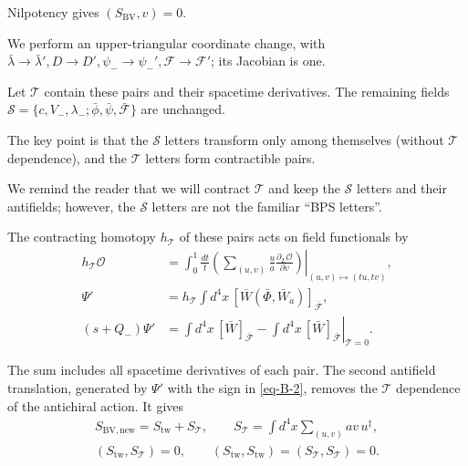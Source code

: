 \documentclass[11pt]{article}
\numberwithin{equation}{section}
\numberwithin{figure}{section}
\numberwithin{table}{section}
\begin{document}
Nilpotency gives $(S_{\mathrm{BV}},v)=0$.

We perform an upper-triangular coordinate change, with $\bar\lambda\to \bar\lambda', D \to D', \psi_- \to\psi_-', \mathcal F \to\mathcal F'$; its Jacobian is one.

Let $\mathcal T$ contain these pairs and their spacetime derivatives. The remaining fields $\mathcal S=\{c,V_-,\lambda_-;\bar\phi,\bar\psi,\bar{\mathcal F}\}$ are unchanged.

The key point is that the $\mathcal S$ letters transform only among themselves (without $\mathcal T$ dependence), and the $\mathcal T$ letters form contractible pairs.

\begin{proofbox}
We remind the reader that we will contract $\mathcal T$ and keep the $\mathcal S$ letters and their antifields; however, the $\mathcal S$ letters are not the familiar ``BPS letters''.
\end{proofbox}

The contracting homotopy $h_{\mathcal T}$ of these pairs acts on field functionals by
\begin{equation}\label{eq-B-4}
\begin{aligned}
h_{\mathcal T}\mathcal O
&=\int_0^1\frac{dt}{t}
\left.\left(\sum_{(u,v)}\frac ua\frac{\partial_L\mathcal O}{\partial v}\right)
\right|_{(u,v)\mapsto(tu,tv)},\\
\Psi'&=h_{\mathcal T}\int d^4x\,[\bar W(\bar\Phi,\bar W_{\dot a})]_{\bar{\mathcal F}},\\
(s+Q_-)\Psi'
&=\int d^4x\,[\bar W]_{\bar{\mathcal F}}
-\left.\int d^4x\,[\bar W]_{\bar{\mathcal F}}\right|_{\mathcal T=0}.
\end{aligned}
\end{equation}

The sum includes all spacetime derivatives of each pair. The second antifield translation, generated by $\Psi'$ with the sign in \eqref{eq-B-2}, removes the $\mathcal T$ dependence of the antichiral action. It gives
\begin{equation}\label{eq-B-5}
\begin{gathered}
S_{\mathrm{BV,new}}=S_{\mathrm{tw}}+S_{\mathcal T},\qquad
S_{\mathcal T}=\int d^4x\sum_{(u,v)}av\,u^\ddagger,\\
(S_{\mathrm{tw}},S_{\mathcal T})=0,\qquad
(S_{\mathrm{tw}},S_{\mathrm{tw}})=(S_{\mathcal T},S_{\mathcal T})=0.
\end{gathered}
\end{equation}
\end{document}
